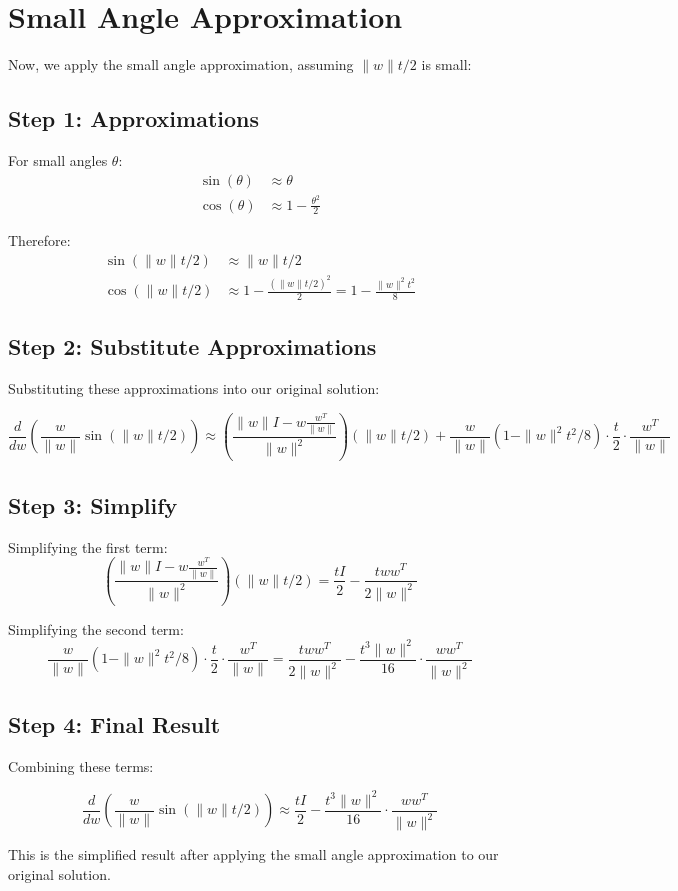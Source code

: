 \documentclass{article}
\begin{document}
\section{Small Angle Approximation}

Now, we apply the small angle approximation, assuming $\|w\|t/2$ is small:

\subsection{Step 1: Approximations}

For small angles $\theta$:
\begin{align*}
\sin(\theta) &\approx \theta \\
\cos(\theta) &\approx 1 - \frac{\theta^2}{2}
\end{align*}

Therefore:
\begin{align*}
\sin(\|w\|t/2) &\approx \|w\|t/2 \\
\cos(\|w\|t/2) &\approx 1 - \frac{(\|w\|t/2)^2}{2} = 1 - \frac{\|w\|^2t^2}{8}
\end{align*}

\subsection{Step 2: Substitute Approximations}

Substituting these approximations into our original solution:

$$\frac{d}{dw}\left(\frac{w}{\|w\|} \sin(\|w\| t/2)\right) \approx \left(\frac{\|w\|I - w\frac{w^T}{\|w\|}}{\|w\|^2}\right) (\|w\|t/2) + \frac{w}{\|w\|} (1 - \|w\|^2t^2/8) \cdot \frac{t}{2} \cdot \frac{w^T}{\|w\|}$$

\subsection{Step 3: Simplify}

Simplifying the first term:
$$\left(\frac{\|w\|I - w\frac{w^T}{\|w\|}}{\|w\|^2}\right) (\|w\|t/2) = \frac{tI}{2} - \frac{tw w^T}{2\|w\|^2}$$

Simplifying the second term:
$$\frac{w}{\|w\|} (1 - \|w\|^2t^2/8) \cdot \frac{t}{2} \cdot \frac{w^T}{\|w\|} = \frac{tw w^T}{2\|w\|^2} - \frac{t^3\|w\|^2}{16} \cdot \frac{w w^T}{\|w\|^2}$$

\subsection{Step 4: Final Result}

Combining these terms:

$$\frac{d}{dw}\left(\frac{w}{\|w\|} \sin(\|w\| t/2)\right) \approx \frac{tI}{2} - \frac{t^3\|w\|^2}{16} \cdot \frac{w w^T}{\|w\|^2}$$

This is the simplified result after applying the small angle approximation to our original solution.
\end{document}
